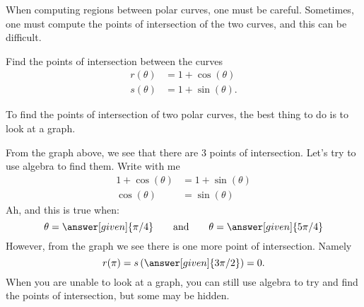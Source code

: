 \documentclass{ximera}
\begin{document}
When computing regions between polar curves, one must be
careful. Sometimes, one must compute the points of intersection of the
two curves, and this can be difficult.
\begin{example}
  Find the points of intersection between the curves
  \begin{align*}
    r(\theta) &= 1+ \cos(\theta)\\
    s(\theta) &= 1+ \sin(\theta).
  \end{align*}
  \begin{explanation}
    To find the points of intersection of two polar curves, the best
    thing to do is to look at a graph.
    \begin{image}
    \end{image}
    From the graph above, we see that there are $3$ points of
    intersection.  Let's try to use algebra to find them. Write with me
    \begin{align*}
      1+ \cos(\theta) &= 1+ \sin(\theta)\\
      \cos(\theta) &=\sin(\theta)
    \end{align*}
    Ah, and this is true when:
    \[
    \theta = \answer[given]{\pi/4} \qquad\text{and}\qquad\theta= \answer[given]{5\pi/4}
    \]
    However, from the graph we see there is one more point of
    intersection. Namely
    \[
    r(\pi) = s\left(\answer[given]{3\pi/2}\right) = 0.
    \]
    When you are unable to look at a graph, you can
    still use algebra to try and find the points of intersection, but
    some may be hidden.
  \end{explanation}
\end{example}
\end{document}
